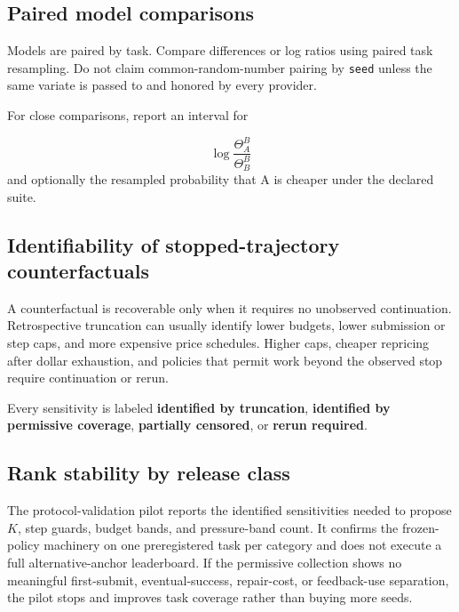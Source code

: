 \documentclass[11pt]{article}
\begin{document}
\subsection{Paired model comparisons}\hypertarget{112-paired-model-comparisons}{}\label{112-paired-model-comparisons}

Models are paired by task. Compare differences or log ratios using paired task resampling. Do not claim common-random-number pairing by \texttt{seed} unless the same variate is passed to and honored by every provider.

For close comparisons, report an interval for

\[
\log\frac{\Theta^B_A}{\Theta^B_B}
\]
and optionally the resampled probability that A is cheaper under the declared suite.

\subsection{Identifiability of stopped-trajectory counterfactuals}\hypertarget{113-identifiability-of-stopped-trajectory-counterfactuals}{}\label{113-identifiability-of-stopped-trajectory-counterfactuals}

A counterfactual is recoverable only when it requires no unobserved continuation. Retrospective truncation can usually identify lower budgets, lower submission or step caps, and more expensive price schedules. Higher caps, cheaper repricing after dollar exhaustion, and policies that permit work beyond the observed stop require continuation or rerun.

Every sensitivity is labeled \textbf{identified by truncation}, \textbf{identified by permissive coverage}, \textbf{partially censored}, or \textbf{rerun required}.

\subsection{Rank stability by release class}\hypertarget{114-rank-stability-by-release-class}{}\label{114-rank-stability-by-release-class}

The protocol-validation pilot reports the identified sensitivities needed to propose $K$, step guards, budget bands, and pressure-band count. It confirms the frozen-policy machinery on one preregistered task per category and does not execute a full alternative-anchor leaderboard. If the permissive collection shows no meaningful first-submit, eventual-success, repair-cost, or feedback-use separation, the pilot stops and improves task coverage rather than buying more seeds.
\end{document}
